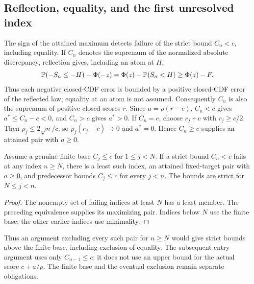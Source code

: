 \subsection{Reflection, equality, and the first unresolved index}
\label{v9:core:reflection}
The sign of the attained maximum detects failure of the strict bound $C_n<c$,
including equality. If $C_n$ denotes the supremum of the normalized
absolute discrepancy, reflection gives, including an atom at $H$,
\[
 \mathbb P(-S_n\le-H)-\Phi(-z)
 =\Phi(z)-\mathbb P(S_n<H)\ge\Phi(z)-F.
\]
Thus each negative closed-CDF error is bounded by a positive closed-CDF
error of the reflected law; equality at an atom is not assumed.
Consequently $C_n$ is also the supremum of positive
closed scores $r$. Since $a=\rho(r-c)$, $C_n<c$ gives
$a^*\le C_n-c<0$, and $C_n>c$ gives $a^*>0$. If $C_n=c$, choose
$r_j\uparrow c$ with $r_j\ge c/2$. Then
$\rho_j\le2\sqrt n/c$, so $\rho_j(r_j-c)\to0$ and $a^*=0$.
Hence $C_n\ge c$ supplies an attained pair with $a\ge0$.

\begin{corollary}\label{v9:core:first-failure}
Assume a genuine finite base $C_j\le c$ for $1\le j<N$. If a strict
bound $C_n<c$ fails at any index $n\ge N$, there is a least such index,
an attained fixed-target pair with $a\ge0$, and predecessor bounds
$C_j\le c$ for every $j<n$. The bounds are strict for $N\le j<n$.
\end{corollary}
\begin{proof}
The nonempty set of failing indices at least $N$ has a least member.
The preceding equivalence supplies its maximizing pair. Indices below
$N$ use the finite base; the other earlier indices use minimality.
\end{proof}
Thus an argument excluding every such pair for $n\ge N$ would give
strict bounds above the finite base, including exclusion of equality.
The subsequent entry argument uses only $C_{n-1}\le c$; it does not
use an upper bound for the actual score $c+a/\rho$. The finite base
and the eventual exclusion remain separate obligations.
